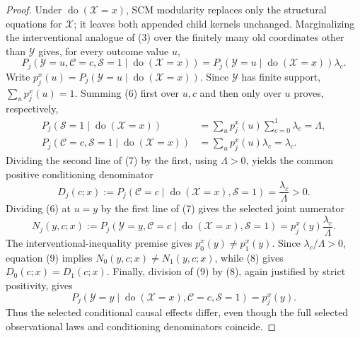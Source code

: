\documentclass{article}
\begin{document}
\begin{proof}
Under \(\operatorname{do}(\mathcal X=x)\), SCM modularity replaces only the structural equations for \(\mathcal X\); it leaves both appended child kernels unchanged. Marginalizing the interventional analogue of (3) over the finitely many old coordinates other than \(\mathcal Y\) gives, for every outcome value \(u\),
\[
 P_j(\mathcal Y=u,\mathcal C=c,\mathcal S=1
      \mid\operatorname{do}(\mathcal X=x))
 =P_j(\mathcal Y=u\mid\operatorname{do}(\mathcal X=x))
  \lambda_c.                                             \tag{6}
\]
Write \(p_j^x(u)=P_j(\mathcal Y=u\mid\operatorname{do}(\mathcal X=x))\). Since \(\mathcal Y\) has finite support, \(\sum_u p_j^x(u)=1\). Summing (6) first over \(u,c\) and then only over \(u\) proves, respectively,
\[
\begin{aligned}
 P_j(\mathcal S=1\mid\operatorname{do}(\mathcal X=x))
   &=\sum_u p_j^x(u)\sum_{c=0}^1\lambda_c=\Lambda,\\
 P_j(\mathcal C=c,\mathcal S=1
      \mid\operatorname{do}(\mathcal X=x))
   &=\sum_u p_j^x(u)\lambda_c=\lambda_c.                 \tag{7}
\end{aligned}
\]
Dividing the second line of (7) by the first, using \(\Lambda>0\), yields the common positive conditioning denominator
\[
 D_j(c;x):=P_j(\mathcal C=c\mid
       \operatorname{do}(\mathcal X=x),\mathcal S=1)
 =\frac{\lambda_c}{\Lambda}>0.                           \tag{8}
\]
Dividing (6) at \(u=y\) by the first line of (7) gives the selected joint numerator
\[
 N_j(y,c;x):=P_j(\mathcal Y=y,\mathcal C=c\mid
       \operatorname{do}(\mathcal X=x),\mathcal S=1)
 =p_j^x(y)\frac{\lambda_c}{\Lambda}.                     \tag{9}
\]
The interventional-inequality premise gives \(p_0^x(y)\ne p_1^x(y)\). Since \(\lambda_c/\Lambda>0\), equation (9) implies \(N_0(y,c;x)\ne N_1(y,c;x)\), while (8) gives \(D_0(c;x)=D_1(c;x)\). Finally, division of (9) by (8), again justified by strict positivity, gives
\[
 P_j(\mathcal Y=y\mid\operatorname{do}(\mathcal X=x),
       \mathcal C=c,\mathcal S=1)
 =p_j^x(y).                                               \tag{10}
\]
Thus the selected conditional causal effects differ, even though the full selected observational laws and conditioning denominators coincide.


\end{proof}
\end{document}
